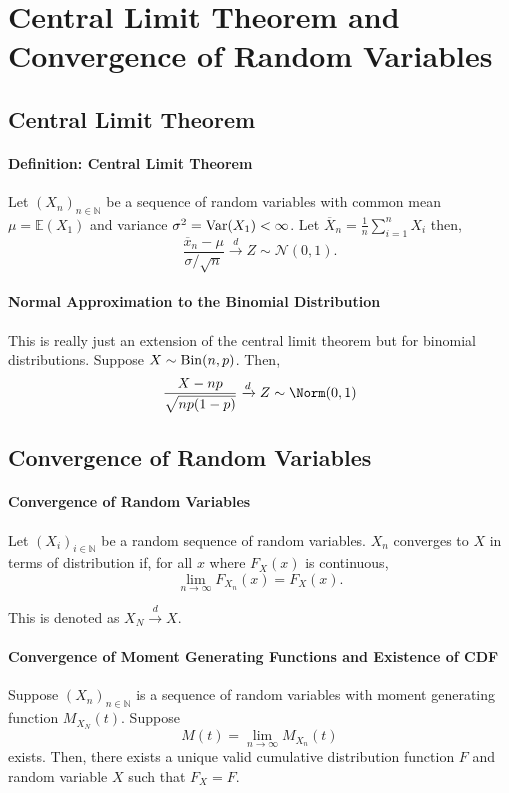\section{Central Limit Theorem and Convergence of Random Variables}

\subsection{Central Limit Theorem}

\paragraph{Definition: Central Limit Theorem}
Let \( (X_n)_{n \in  \mathbb{N}} \) be a sequence of random variables
with common mean  \( \mu = \mathbb{E}(X_1)  \) and variance
\( \sigma^2 = \mathrm{Var}(X_1) < \infty\).
Let \( \overline{X}_n = \frac{1}{n} \sum_{i=1}^n X_i \) then, \[
    \frac{\overline{x}_n - \mu}{\sigma / \sqrt{ n }}
    \xrightarrow{d}  Z \sim \mathcal{N}(0, 1)
.\]

\paragraph{Normal Approximation to the Binomial Distribution}
This is really just an extension of the central limit theorem but for
binomial distributions.
Suppose \( X \sim \mathrm{Bin}(n, p) \). Then, \[
    \frac{X - np}{\sqrt{np(1- p)}} \xrightarrow{d} Z \sim \Norm(0, 1)
\]

\subsection{Convergence of Random Variables}

\paragraph{Convergence of Random Variables}
Let \( (X_i)_{i \in  \mathbb{N}} \) be a random sequence of random variables.
\( X_n \) converges to  \( X \) in terms of distribution if,
for all \( x \) where  \( F_X(x) \) is continuous,  \[
    \lim_{n \to  \infty} F_{X_n}(x) = F_X(x)
.\]

This is denoted as \( X_N \xrightarrow{d} X \).

\paragraph{Convergence of Moment Generating Functions and Existence of CDF}
Suppose \( (X_n)_{n \in  \mathbb{N}} \) is a sequence of random variables with
moment generating function  \( M_{X_N}(t) \).
Suppose  \[
    M(t) = \lim_{n \to \infty} M_{X_n}(t)
\]
exists. Then, there exists a unique valid cumulative distribution function
\( F \)  and random variable  \( X \) such that
 \( F_X = F \).


